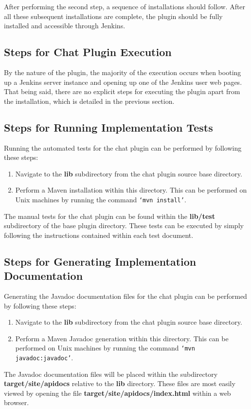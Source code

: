 \documentclass{article}
\begin{document}
		After performing the second step, a sequence of installations should
		follow.  After all these subsequent installations are complete, the
		plugin should be fully installed and accessible through Jenkins.

		\subsection[Plugin Execution]{Steps for Chat Plugin Execution}
		By the nature of the plugin, the majority of the execution occurs when
		booting up a Jenkins server instance and opening up one of the Jenkins
		user web pages.  That being said, there are no explicit steps for
		executing the plugin apart from the installation, which is detailed
		in the previous section.

		\subsection[Plugin Test Execution]{Steps for Running Implementation Tests}
		Running the automated tests for the chat plugin can be performed by
		following these steps:

		\begin{enumerate}
			\item Navigate to the \textbf{lib} subdirectory from the chat
			plugin source base directory.

			\item Perform a Maven installation within this directory.  This
			can be performed on Unix machines by running the command
			\texttt{`mvn install'}.
		\end{enumerate}

		The manual tests for the chat plugin can be found within the 
		\textbf{lib/test} subdirectory of the base plugin directory.  These
		tests can be executed by simply following the instructions contained
		within each test document.

		\subsection[Plugin Document Generation]{Steps for Generating Implementation Documentation}
		Generating the Javadoc documentation files for the chat plugin can
		be performed by following these steps:

		\begin{enumerate}
			\item Navigate to the \textbf{lib} subdirectory from the chat
			plugin source base directory.

			\item Perform a Maven Javadoc generation within this directory.  
			This can be performed on Unix machines by running the command
			\texttt{`mvn javadoc:javadoc'}.
		\end{enumerate}

		The Javadoc documentation files will be placed within the subdirectory
		\textbf{target/site/apidocs} relative to the \textbf{lib} directory.  
		These files are most easily viewed by opening the file 
		\textbf{target/site/apidocs/index.html} within a web browser.
\end{document}
